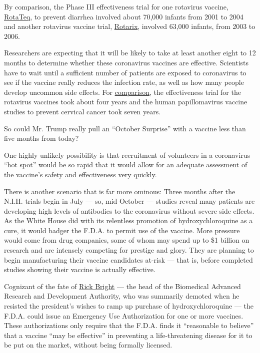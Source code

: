 By comparison, the Phase III effectiveness trial for one rotavirus
vaccine,
\href{https://www.cdc.gov/vaccines/pubs/surv-manual/chpt13-rotavirus.html}{RotaTeq},
to prevent diarrhea involved about 70,000 infants from 2001 to 2004 and
another rotavirus vaccine trial,
\href{https://www.nejm.org/doi/10.1056/NEJMoa052664?url_ver=Z39.88-2003\&rfr_id=ori\%3Arid\%3Acrossref.org\&rfr_dat=cr_pub++0www.ncbi.nlm.nih.gov}{Rotarix},
involved 63,000 infants, from 2003 to 2006.

Researchers are expecting that it will be likely to take at least
another eight to 12 months to determine whether these coronavirus
vaccines are effective. Scientists have to wait until a sufficient
number of patients are exposed to coronavirus to see if the vaccine
really reduces the infection rate, as well as how many people develop
uncommon side effects. For
\href{https://www.sciencedirect.com/science/article/pii/S0140673617318214}{comparison},
the effectiveness trial for the rotavirus vaccines took about four years
and the human papillomavirus vaccine studies to prevent cervical cancer
took seven years.

So could Mr. Trump really pull an ``October Surprise'' with a vaccine
less than five months from today?

One highly unlikely possibility is that recruitment of volunteers in a
coronavirus ``hot spot'' would be so rapid that it would allow for an
adequate assessment of the vaccine's safety and effectiveness very
quickly.

There is another scenario that is far more ominous: Three months after
the N.I.H. trials begin in July --- so, mid October --- studies reveal
many patients are developing high levels of antibodies to the
coronavirus without severe side effects. As the White House did with its
relentless promotion of hydroxychloroquine as a cure, it would badger
the F.D.A. to permit use of the vaccine. More pressure would come from
drug companies, some of whom may spend up to \$1 billion on research and
are intensely competing for prestige and glory. They are planning to
begin manufacturing their vaccine candidates at-risk --- that is, before
completed studies showing their vaccine is actually effective.

Cognizant of the fate of
\href{https://www.washingtonpost.com/health/2020/05/05/rick-bright-hydroxychloroquine-whistleblower-complaint/}{Rick
Bright} --- the head of the Biomedical Advanced Research and Development
Authority, who was summarily demoted when he resisted the president's
wishes to ramp up purchase of hydroxychloroquine --- the F.D.A. could
issue an Emergency Use Authorization for one or more vaccines. These
authorizations only require that the F.D.A. finds it ``reasonable to
believe'' that a vaccine ``may be effective'' in preventing a
life-threatening disease for it to be put on the market, without being
formally licensed.

